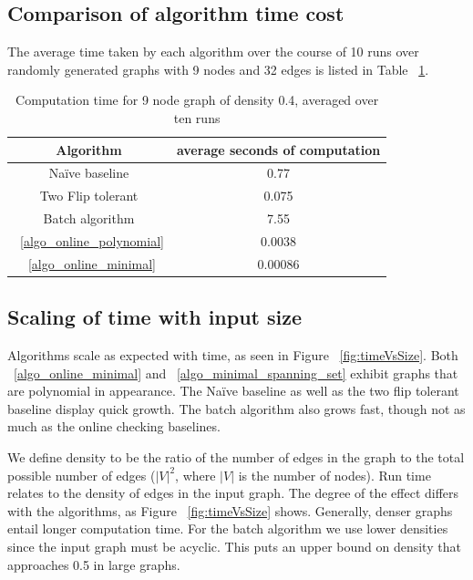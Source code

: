 \documentclass[sigplan,review,anonymous]{acmart}
\begin{document}
{\subsection{Comparison of algorithm time cost}
The average time taken by each algorithm over the course of 10 runs over randomly generated graphs with 9 nodes and 32 edges is listed in Table ~\ref{tab:times}.

\begin{table}
\begin{tabular}{|c|c|}
    \hline
    Algorithm & average seconds of computation \\
    \hline
    Na\"{i}ve baseline & 0.77 \\
    Two Flip tolerant & 0.075 \\
    Batch algorithm & 7.55 \\
    ~\ref{algo_online_polynomial} & 0.0038 \\
    ~\ref{algo_online_minimal} & 0.00086 \\
    \hline
\end{tabular}
\caption{Computation time for 9 node graph of density 0.4, averaged over ten runs}
\label{tab:times} %
\end{table}
    
\subsection{Scaling of time with input size}

Algorithms scale as expected with time, as seen in Figure ~\ref{fig:timeVsSize}. 
Both ~\ref{algo_online_minimal} and ~\ref{algo_minimal_spanning_set} exhibit graphs that are polynomial in appearance.
The Na\"{i}ve baseline as well as the two flip tolerant baseline display quick growth.
The batch algorithm also grows fast, though not as much as the online checking baselines.

We define density to be the ratio of the number of edges in the graph to the total possible number of edges ($|V|^2$, where $|V|$ is the number of nodes).
Run time relates to the density of edges in the input graph.
The degree of the effect differs with the algorithms, as Figure ~\ref{fig:timeVsSize} shows.
Generally, denser graphs entail longer computation time.
For the batch algorithm we use lower densities since the input graph must be acyclic. This puts an upper bound on density that approaches 0.5 in large graphs.

}
\end{document}
